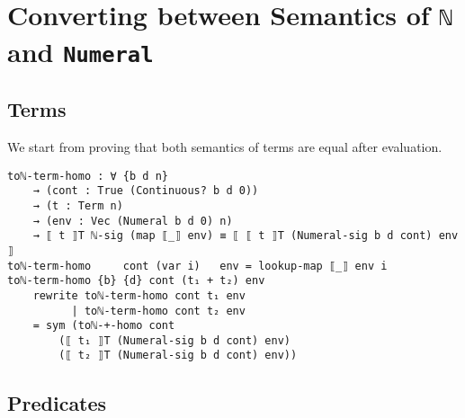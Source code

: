 \documentclass[\main/thesis.tex]{subfiles}
\begin{document}

\section{Converting between Semantics of \lstinline|ℕ| and \lstinline|Numeral|}


\subsection{Terms}

We start from proving that both semantics of terms are equal after evaluation.

\begin{lstlisting}[basicstyle=\ttfamily\scriptsize]
toℕ-term-homo : ∀ {b d n}
    → (cont : True (Continuous? b d 0))
    → (t : Term n)
    → (env : Vec (Numeral b d 0) n)
    → ⟦ t ⟧T ℕ-sig (map ⟦_⟧ env) ≡ ⟦ ⟦ t ⟧T (Numeral-sig b d cont) env ⟧
toℕ-term-homo     cont (var i)   env = lookup-map ⟦_⟧ env i
toℕ-term-homo {b} {d} cont (t₁ + t₂) env
    rewrite toℕ-term-homo cont t₁ env
          | toℕ-term-homo cont t₂ env
    = sym (toℕ-+-homo cont
        (⟦ t₁ ⟧T (Numeral-sig b d cont) env)
        (⟦ t₂ ⟧T (Numeral-sig b d cont) env))
\end{lstlisting}

\subsection{Predicates}


%
\end{document}
